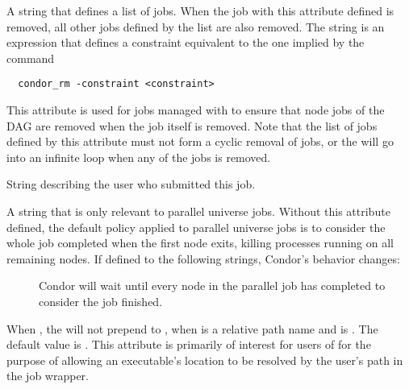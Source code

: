 \begin{description}
\label{attribute-OtherJobRemoveRequirements}
\item[\AdAttr{OtherJobRemoveRequirements}:]
A string that defines a list of jobs.
When the job with this attribute defined is removed,
all other jobs defined by the list are also removed.
The string is an expression that defines a constraint equivalent to
the one implied by the command 
\begin{verbatim}
  condor_rm -constraint <constraint>
\end{verbatim}
This attribute is used for jobs managed with  to ensure
that node jobs of the DAG are removed when the  job
itself is removed.  Note that the list of jobs defined by this attribute
must not form a cyclic removal of jobs,
or the  will go into an infinite loop 
when any of the jobs is removed.

\item[\AdAttr{Owner}:]  String describing the user who submitted this
job.

\item[\AdAttr{ParallelShutdownPolicy}:]  A string that is only relevant
to parallel universe jobs.  Without this attribute defined, the default
policy applied to parallel universe jobs is to consider the whole job
completed when the first node exits, killing processes running on
all remaining nodes.  If defined to the following strings, Condor's
behavior changes:
  \begin{description}
  \item[] Condor will wait until every node in 
  the parallel job has completed to consider the job finished.
  \end{description}

\item[\AdAttr{PreserveRelativeExecutable}:]  When , 
the  will not prepend 
to , when  is a relative path name
and  is .  
The default value is .
This attribute is primarily of interest for users of 
for the purpose of allowing an executable's location to be resolved 
by the user's path in the job wrapper.


\end{description}
